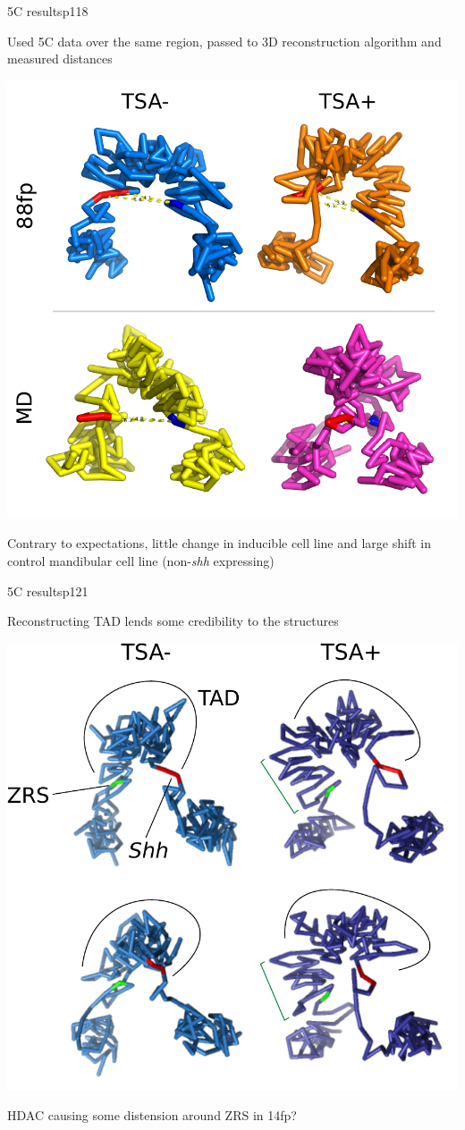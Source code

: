 \documentclass{beamer}
\begin{document}
\begin{frame}{5C results}{p118}

Used 5C data over the same region, passed to 3D reconstruction algorithm and measured distances \\

\centerline{
\includegraphics[width=.5\textwidth]{../figs/5c3d.pdf}
}
\vspace{1em}

Contrary to expectations, little change in inducible cell line and large shift in control mandibular cell line (non-\emph{shh} expressing)

\end{frame}

\begin{frame}{5C results}{p121}

Reconstructing TAD lends some credibility to the structures \\

\vspace{1em}

\centerline{
\includegraphics[width=.5\textwidth]{../figs/decompaction.pdf}
}
\vspace{1em}

HDAC causing some distension around ZRS in 14fp?

\end{frame}
\end{document}
